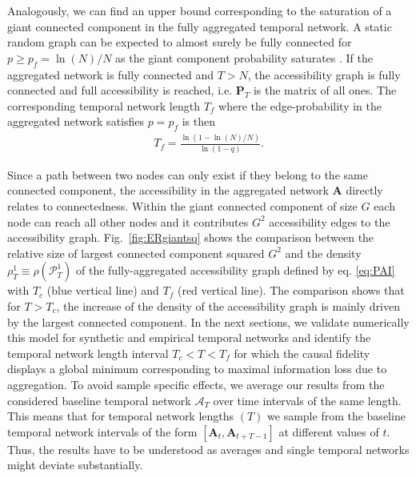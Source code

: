 \documentclass[%
 reprint,
 amsmath,amssymb,
 aps,
]{revtex4-2}
\begin{document}
Analogously, we can find an upper bound corresponding to the saturation of a giant connected component in the fully aggregated temporal network. 
A static random graph can be expected to almost surely be fully connected for $p\ge p_f = {\ln(N)}/{N}$  as the giant component probability saturates \cite{ERevolution}. If the aggregated network is fully connected and  $T>N$, the accessibility graph is fully connected and full accessibility is reached, i.e. $\mathbf{P}_T$ is the matrix of all ones. The corresponding temporal network length $T_f$ where the edge-probability in the aggregated network satisfies $p = p_f$ is then
\begin{eqnarray}
T_f=\frac{\ln(1-{\ln(N)}/{N})}{\ln(1-q)} 
\label{eq:TC2}.
\end{eqnarray}

Since a path between two nodes can only exist if they belong to the same connected component, the accessibility in the aggregated network $\mathbf{A}$  directly relates to connectedness. 
Within the giant connected component of size $G$ each node can reach all other nodes and it contributes $G^2$ accessibility edges to the accessibility graph.
Fig.~\ref{fig:ERgiantsq} shows the comparison between the relative size of largest connected component squared $G^2$ and the density $\rho_T^1 \equiv \rho(\mathcal{P}_T^1)$ of the fully-aggregated accessibility graph defined by eq. \eqref{eq:PAI} with $T_c$ (blue vertical line) and $T_f$ (red vertical line). The comparison shows that for $T>T_c$, the increase of the density of the accessibility graph is mainly driven by the largest connected component. 
In the next sections, we validate numerically this model for synthetic and empirical temporal networks and identify the temporal network length interval $T_c<T<T_f$ for which the causal fidelity displays a global minimum corresponding to maximal information loss due to aggregation.
To avoid sample specific effects, we average our results from the considered baseline temporal network $\mathcal{A}_T$ over time intervals of the same length. 
This means that for temporal network lengths $(T)$ we sample from the baseline temporal network intervals of the form  $[\mathbf{A}_t,\mathbf{A}_{t+T-1}]$ at different values of $t$. 
Thus, the results have to be understood as averages and single temporal networks might deviate substantially.
\end{document}
